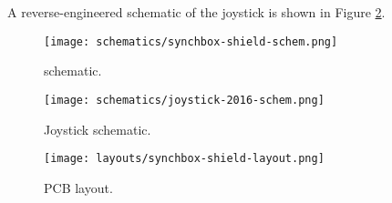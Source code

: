 A reverse-engineered schematic of the joystick is shown in Figure 
\ref{fig-joystick}.

\begin{figure}[p]
\begin{center}
\texttt{[image: schematics/synchbox-shield-schem.png]}
\end{center}
\caption{{\projectname} schematic.}\label{fig-schematic}
\end{figure}

\begin{figure}[p]
\begin{center}
\texttt{[image: schematics/joystick-2016-schem.png]}
\end{center}
\caption{Joystick schematic.}\label{fig-joystick}
\end{figure}

\begin{figure}[p]
\begin{center}
\texttt{[image: layouts/synchbox-shield-layout.png]}
\end{center}
\caption{{\projectname} PCB layout.}\label{fig-pcb}
\end{figure}

%

